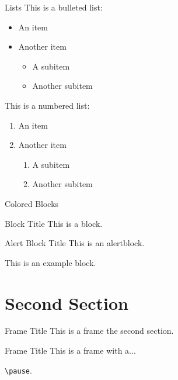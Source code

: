 \documentclass{beamer}
\begin{document}
    \begin{frame}{Lists}
        This is a bulleted list:
        \begin{itemize}
            \item An item

            \item Another item
            \begin{itemize}
                \item A subitem

                \item Another subitem
            \end{itemize}
        \end{itemize}

        This is a numbered list:
        \begin{enumerate}
            \item An item

            \item Another item
            \begin{enumerate}
                \item A subitem

                \item Another subitem
            \end{enumerate}
        \end{enumerate}
    \end{frame}

    \begin{frame}{Colored Blocks}
        \begin{block}{Block Title}
            This is a block.
        \end{block}

        \begin{alertblock}{Alert Block Title}
            This is an alertblock.
        \end{alertblock}

        \begin{example}
            This is an example block.
        \end{example}
    \end{frame}




\section{Second Section}

    \begin{frame}{Frame Title}
        This is a frame the second section.
    \end{frame}

    \begin{frame}{Frame Title}
        This is a frame with a...

        \pause

        \texttt{\textbackslash pause}.
    \end{frame}
\end{document}
